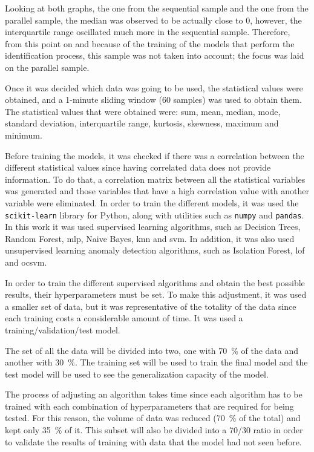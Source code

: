 Looking at both graphs, the one from the sequential sample and the one from the parallel sample, the median was observed to be actually close to 0, however, the interquartile range oscillated much more in the sequential sample. Therefore, from this point on and because of the training of the models that perform the identification process, this sample was not taken into account; the focus was laid on the parallel sample.

Once it was decided which data was going to be used, the statistical values were obtained, and a 1-minute sliding window (60 samples) was used to obtain them. The statistical values that were obtained were: sum, mean, median, mode, standard deviation, interquartile range, kurtosis, skewness, maximum and minimum.

Before training the models, it was checked if there was a correlation between the different statistical values since having correlated data does not provide information. To do that, a correlation matrix between all the statistical variables was generated and those variables that have a high correlation value with another variable were eliminated. In order to train the different models, it was used the \texttt{scikit-learn} library for Python, along with utilities such as \texttt{numpy} and \texttt{pandas}. In this work it was used supervised learning algorithms, such as Decision Trees, Random Forest, \acrfull{mlp}, Naive Bayes, \acrfull{knn} and \acrfull{svm}. In addition, it was also used unsupervised learning anomaly detection algorithms, such as Isolation Forest, \acrfull{lof} and \acrfull{ocsvm}.

In order to train the different supervised algorithms and obtain the best possible results, their hyperparameters must be set. To make this adjustment, it was used a smaller set of data, but it was representative of the totality of the data since each training costs a considerable amount of time. It was used a training/validation/test model.
 
 
The set of all the data will be divided into two, one with \SI{70}{\percent} of the data and another with \SI{30}{\percent}. The training set will be used to train the final model and the test model will be used to see the generalization capacity of the model.


The process of adjusting an algorithm takes time since each algorithm has to be trained with each combination of hyperparameters that are required for being tested. For this reason, the volume of data was reduced (\SI{70}{\percent} of the total) and kept only \SI{35}{\percent} of it. This subset will also be divided into a 70/30 ratio in order to validate the results of training with data that the model had not seen before.

